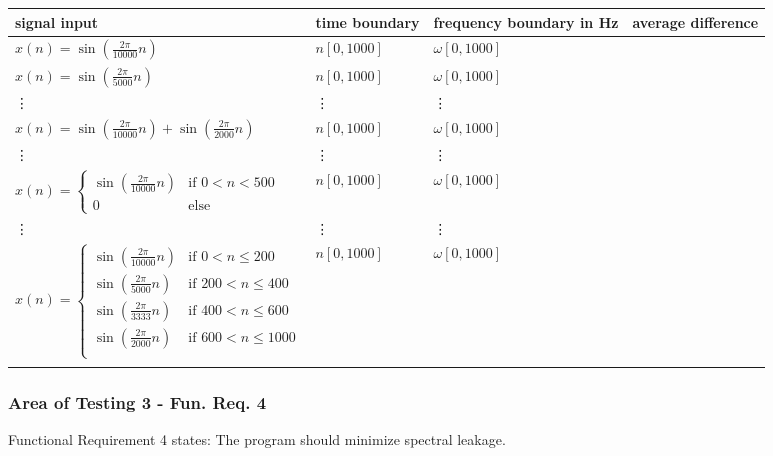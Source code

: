 \documentclass[12pt, titlepage]{article}
\begin{document}
\begin{table}[!h]
  \caption{Input Signals for area of testing 2, assume a sampling period of $1^{-5}$ seconds. } \label{Tblreq3}
  \renewcommand{\arraystretch}{1.2}
\noindent \begin{longtable*}{l m{2cm} m{2cm} c} 
  \toprule
  \textbf{signal input} & \textbf{time boundary} & \textbf{frequency boundary in Hz} & \textbf{average difference}\\
  \midrule 
  $x(n) = \sin (\frac{2 \pi}{10000} n)$ & $n[0,1000]$ & $\omega[0, 1000]$ &  \\
  $x(n) = \sin (\frac{2 \pi}{5000}  n)$ & $n[0,1000]$ & $\omega[0, 1000]$ &  \\
  \vdots & \vdots & \vdots & \\
  $x(n) = \sin (\frac{2 \pi}{10000} n) + \sin (\frac{2 \pi}{2000}  n)$ & $n[0,1000]$ & $\omega[0, 1000]$ &  \\
  \vdots & \vdots & \vdots & \\
  $x(n) = \begin{cases} 
  \sin (\frac{2 \pi}{10000}  n) & \text{if } 0 < n < 500 \\
  0 &\text{else}
    \end{cases}$   & $n[0,1000]$ & $\omega[0, 1000]$ & \\
  \vdots & \vdots & \vdots & \\
  
  $x(n) = \begin{cases} 
  \sin (\frac{2 \pi}{10000}  n) & \text{if } 0 < n \leq 200 \\
  \sin (\frac{2 \pi}{5000}  n)&\text{if }  200 < n \leq 400 \\
  \sin (\frac{2 \pi}{3333}  n)&\text{if }  400 < n \leq 600 \\
   \sin (\frac{2 \pi}{2000}  n)&\text{if }  600 < n \leq 1000 \\
    \end{cases}$   & $n[0,1000]$ & $\omega[0, 1000]$ & \\
\bottomrule \\
\end{longtable*}
\end{table}


\subsubsection{Area of Testing 3 - Fun. Req. 4} \label{test_req4}
Functional Requirement 4 states: The program should minimize spectral leakage. 
\end{document}
